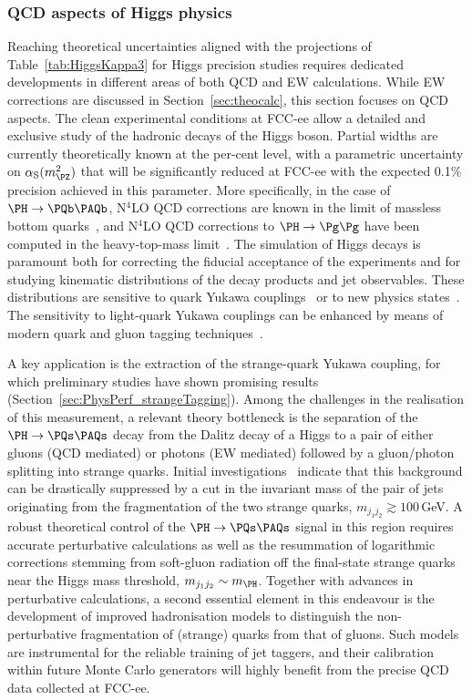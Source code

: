 \subsubsection{QCD aspects of Higgs physics}

Reaching theoretical uncertainties aligned with the projections of Table~\ref{tab:HiggsKappa3} for Higgs precision studies 
requires dedicated developments in different areas of both QCD and EW calculations. 
While EW corrections are discussed in Section~\ref{sec:theocalc}, 
this section focuses on QCD aspects.
The clean experimental conditions at FCC-ee allow a detailed and exclusive study of the hadronic decays of the Higgs boson. 
Partial widths are currently theoretically known at the per-cent level, 
with a  parametric uncertainty on $\as(m^2_{\PZ})$ that will be significantly reduced at FCC-ee with the expected 0.1\% precision achieved in this parameter. 
More specifically, in the case of $\PH \to \PQb\PAQb$, 
N$^4$LO QCD corrections are known in the limit of massless bottom quarks~\cite{Baikov:2005rw,Davies:2017xsp,Herzog:2017dtz}, 
and N$^4$LO QCD corrections to $\PH \to \Pg\Pg$ have been computed in the heavy-top-mass limit~\cite{Herzog:2017dtz}.
The simulation of Higgs decays is paramount both for correcting the fiducial acceptance of the experiments
and for studying kinematic distributions of the decay products and jet observables.
These distributions are sensitive to quark Yukawa couplings~\cite{Gao:2016jcm,Bi:2020frc} or 
to new physics states~\cite{Kaplan:2009qt,Curtin:2013fra,Liu:2016zki,Liu:2016ahc,Gao:2019ypl}.
The sensitivity to light-quark Yukawa couplings can be enhanced by means of modern quark and gluon tagging techniques~\cite{Bedeschi:2022rnj}.

A key application is the extraction of the strange-quark Yukawa coupling, 
for which preliminary studies have shown promising results (Section~\ref{sec:PhysPerf_strangeTagging}).
Among the challenges in the realisation of this measurement, 
a relevant theory bottleneck is the separation of the $\PH \to \PQs\PAQs$ decay from 
the Dalitz decay of a Higgs to a pair of either gluons (QCD mediated) or photons (EW mediated) 
followed by a gluon/photon splitting into strange quarks. 
Initial investigations~\cite{QCD4Higgs-SalamSoyez} indicate that 
this background can be drastically suppressed by a cut in the invariant mass of the pair of jets 
originating from the fragmentation of the two strange quarks, $m_{j_1 j_2} \gtrsim 100$\,GeV.
A robust theoretical control of the $\PH \to \PQs\PAQs$ signal in this region 
requires accurate perturbative calculations as well as the resummation of logarithmic corrections 
stemming from soft-gluon radiation off the final-state strange quarks near the Higgs mass threshold, $m_{j_1 j_2} \sim m_{\PH}$.
Together with advances in perturbative calculations, 
a second essential element in this endeavour is the development of improved hadronisation models 
to distinguish the non-perturbative fragmentation of (strange) quarks from that of gluons. 
Such models are instrumental for the reliable training of jet taggers,
and their calibration within future Monte Carlo generators will highly benefit from the precise QCD data collected at FCC-ee.

